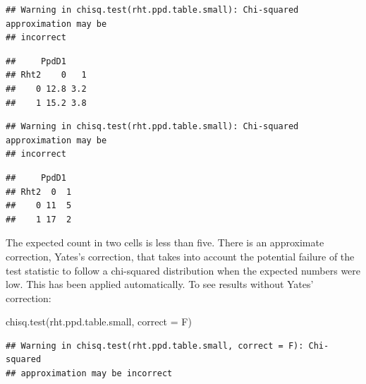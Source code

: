\documentclass[
]{book}
\newenvironment{Shaded}{\begin{snugshade}}{\end{snugshade}}
\newcommand{\AttributeTok}[1]{\textcolor[rgb]{0.77,0.63,0.00}{#1}}
\newcommand{\FunctionTok}[1]{\textcolor[rgb]{0.00,0.00,0.00}{#1}}
\newcommand{\NormalTok}[1]{#1}
\newcommand{\SpecialCharTok}[1]{\textcolor[rgb]{0.00,0.00,0.00}{#1}}
\begin{document}
\begin{Shaded}
\end{Shaded}

\begin{verbatim}
## Warning in chisq.test(rht.ppd.table.small): Chi-squared approximation may be
## incorrect
\end{verbatim}

\begin{verbatim}
##     PpdD1
## Rht2    0   1
##    0 12.8 3.2
##    1 15.2 3.8
\end{verbatim}

\begin{Shaded}
\end{Shaded}

\begin{verbatim}
## Warning in chisq.test(rht.ppd.table.small): Chi-squared approximation may be
## incorrect
\end{verbatim}

\begin{verbatim}
##     PpdD1
## Rht2  0  1
##    0 11  5
##    1 17  2
\end{verbatim}

The expected count in two cells is less than five. There is an approximate correction, Yates's correction, that takes into account the potential failure of the test statistic to follow a chi-squared distribution when the expected numbers were low. This has been applied automatically. To see results without Yates' correction:

\begin{Shaded}
\begin{Highlighting}[]
\FunctionTok{chisq.test}\NormalTok{(rht.ppd.table.small, }\AttributeTok{correct =}\NormalTok{ F)}
\end{Highlighting}
\end{Shaded}

\begin{verbatim}
## Warning in chisq.test(rht.ppd.table.small, correct = F): Chi-squared
## approximation may be incorrect
\end{verbatim}
\end{document}
